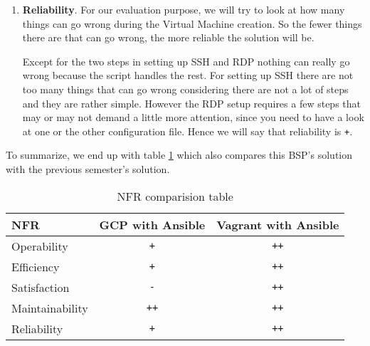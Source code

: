 \begin{enumerate}
	\item \textbf{Reliability}.  For our evaluation purpose, we will
	try to look at how many things can go wrong during the Virtual
	Machine creation. So the fewer things there are that can go wrong,
	the more reliable the solution will be.

	Except for the two steps in setting up SSH and RDP nothing can
	really go wrong because the script handles the rest. For setting
	up SSH there are not too many things that can go wrong considering
	there are not a lot of steps and they are rather simple. However
	the RDP setup requires a few steps that may or may not demand a
	little more attention, since you need to have a look at one or the
	other configuration file. Hence we will say that reliability is
	\verb|+|.

\end{enumerate}

To summarize, we end up with table \ref{tab:nfr} which also compares
this BSP's solution with the previous semester's solution.

\begin{table}
	\begin{tabular}{l||cc}
		NFR              & GCP with Ansible & Vagrant with Ansible \\\hline
		Operability      &   \verb|+|       &    \verb|++| \\
		Efficiency       &   \verb|+|       &    \verb|++| \\
		Satisfaction     &   \verb|-|       &    \verb|++| \\
		Maintainability  &   \verb|++|      &    \verb|++| \\
		Reliability      &   \verb|+|       &    \verb|++| \\
	\end{tabular}
	\caption{NFR comparision table}
	\label{tab:nfr}
\end{table}
